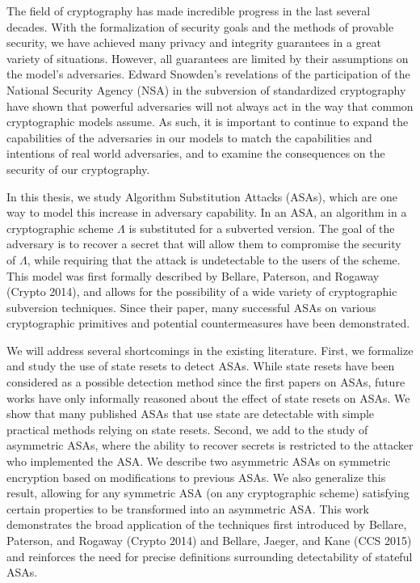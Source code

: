 The field of cryptography has made incredible progress in the last several decades. With the formalization of security goals and the methods of provable security, we have achieved many privacy and integrity guarantees in a great variety of situations. However, all guarantees are limited by their assumptions on the model's adversaries. Edward Snowden's revelations of the participation of the National Security Agency (NSA) in the subversion of standardized cryptography have shown that powerful adversaries will not always act in the way that common cryptographic models assume. As such, it is important to continue to expand the capabilities of the adversaries in our models to match the capabilities and intentions of real world adversaries, and to examine the consequences on the security of our cryptography.

In this thesis, we study Algorithm Substitution Attacks (ASAs), which are one way to model this increase in adversary capability. In an ASA, an algorithm in a cryptographic scheme $\Lambda$ is substituted for a subverted version. The goal of the adversary is to recover a secret that will allow them to compromise the security of $\Lambda$, while requiring that the attack is undetectable to the users of the scheme. This model was first formally described by Bellare, Paterson, and Rogaway (Crypto 2014), and allows for the possibility of a wide variety of cryptographic subversion techniques. Since their paper, many successful ASAs on various cryptographic primitives and potential countermeasures have been demonstrated.

We will address several shortcomings in the existing literature. First, we formalize and study the use of state resets to detect ASAs. While state resets have been considered as a possible detection method since the first papers on ASAs, future works have only informally reasoned about the effect of state resets on ASAs. We show that many published ASAs that use state are detectable with simple practical methods relying on state resets. Second, we add to the study of asymmetric ASAs, where the ability to recover secrets is restricted to the attacker who implemented the ASA. We describe two asymmetric ASAs on symmetric encryption based on modifications to previous ASAs. We also generalize this result, allowing for any symmetric ASA (on any cryptographic scheme) satisfying certain properties to be transformed into an asymmetric ASA. This work demonstrates the broad application of the techniques first introduced by Bellare, Paterson, and Rogaway (Crypto 2014) and Bellare, Jaeger, and Kane (CCS 2015) and reinforces the need for precise definitions surrounding detectability of stateful ASAs.
